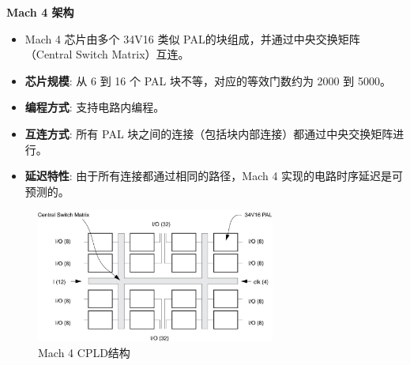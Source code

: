 \begin{frame}[allowframebreaks]{\textbf{Mach 4 架构}}

    \begin{itemize}
    \tightlist
    \item
    Mach 4 芯片由多个 34V16 类似 PAL的块组成，并通过中央交换矩阵（Central Switch Matrix）互连。
    \item
    \textbf{芯片规模}: 从 6 到 16 个 PAL 块不等，对应的等效门数约为 2000
    到 5000。
    \item
    \textbf{编程方式}: 支持电路内编程。
    \item
    \textbf{互连方式}: 所有 PAL
    块之间的连接（包括块内部连接）都通过中央交换矩阵进行。
    \item
    \textbf{延迟特性}: 由于所有连接都通过相同的路径，Mach 4
    实现的电路时序延迟是可预测的。
    \end{itemize}

\begin{figure}
    \centering
    \includegraphics[width=0.7\textwidth]{img1/MAch4.jpeg}
    \caption{Mach 4 CPLD结构}
\end{figure}
\end{frame}

